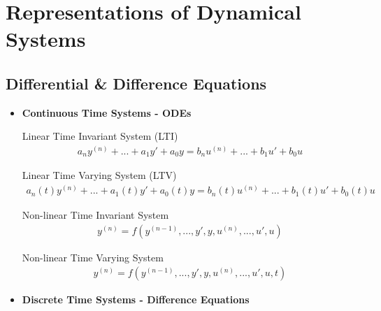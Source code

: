 \documentclass[twoside]{article}
\begin{document}
\newpage

\section{Representations of Dynamical Systems}

\vspace{12pt}

\subsection{Differential \& Difference Equations }

\vspace{12pt}

\begin{itemize}

\item \textbf{Continuous Time Systems - ODEs}

\vspace{12pt}

Linear Time Invariant System (LTI)
%
\begin{align*}
a_n  y^{(n)} + ... + a_1 y' + a_0 y = b_{n}  u^{(n)} + ... + b_1 u' + b_0 u 
\end{align*}

\vspace{12pt}

Linear Time Varying System (LTV)
%
\begin{align*}
a_n(t)  y^{(n)} + ... + a_1(t) y' + a_0(t) y = b_{n}(t)  u^{(n)} + ... + b_1(t) u' + b_0(t) u 
\end{align*}

\vspace{12pt}

Non-linear Time Invariant System
%
\begin{align*}
y^{(n)} = f(y^{(n-1)}, ..., y', y, u^{(n)},  ... , u' , u)
\end{align*}

\vspace{12pt}

Non-linear Time Varying System
%
\begin{align*}
y^{(n)} = f(y^{(n-1)}, ..., y', y, u^{(n)},  ... , u' , u, t)
\end{align*}

\vspace{12pt}

\item \textbf{Discrete Time Systems - Difference Equations}


\end{itemize}
\end{document}
